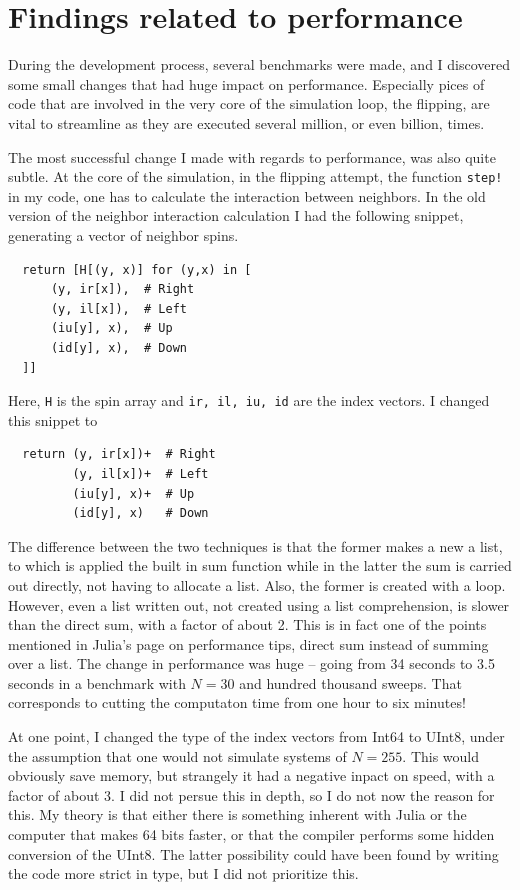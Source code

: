 \documentclass{article}
\begin{document}
\section{Findings related to performance\label{sec:performance}}
During the development process, several benchmarks were made, and I discovered some small changes that had huge impact on performance.
Especially pices of code that are involved in the very core of the simulation loop, the flipping, are vital to streamline as they are executed several million, or even billion, times.

The most successful change I made with regards to performance, was also quite subtle.
At the core of the simulation, in the flipping attempt, the function \verb|step!| in my code, one has to calculate the interaction between neighbors.
In the old version of the neighbor interaction calculation I had the following snippet, generating a vector of neighbor spins.

\begin{lstlisting}
  return [H[(y, x)] for (y,x) in [
      (y, ir[x]),  # Right
      (y, il[x]),  # Left
      (iu[y], x),  # Up
      (id[y], x),  # Down
  ]]
\end{lstlisting}
Here, \verb|H| is the spin array and \verb|ir, il, iu, id| are the index vectors.
I changed this snippet to
\begin{lstlisting}
  return (y, ir[x])+  # Right
         (y, il[x])+  # Left
         (iu[y], x)+  # Up
         (id[y], x)   # Down
\end{lstlisting}
The difference between the two techniques is that the former makes a new a list, to which is applied the built in sum function while in the latter the sum is carried out directly, not having to allocate a list.
Also, the former is created with a loop.
However, even a list written out, not created using a list comprehension, is slower than the direct sum, with a factor of about 2.
This is in fact one of the points mentioned in Julia's page on performance tips, direct sum instead of summing over a list.
The change in performance was huge -- going from 34 seconds to 3.5 seconds in a benchmark with $N=30$ and hundred thousand sweeps.
That corresponds to cutting the computaton time from one hour to six minutes!

At one point, I changed the type of the index vectors from Int64 to UInt8, under the assumption that one would not simulate systems of $N=255$.
This would obviously save memory, but strangely it had a negative inpact on speed, with a factor of about 3.
I did not persue this in depth, so I do not now the reason for this.
My theory is that either there is something inherent with Julia or the computer that makes 64 bits faster, or that the compiler performs some hidden conversion of the UInt8.
The latter possibility could have been found by writing the code more strict in type, but I did not prioritize this.
\end{document}
